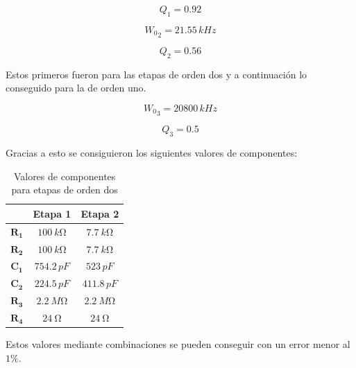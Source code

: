 \documentclass[11pt, a4paper]{article}
\begin{document}
\begin{equation}
	Q_1 = 0.92
\end{equation}

\begin{equation}
	{W_0}_2 = 21.55 \, kHz
\end{equation}

\begin{equation}
	Q_2 = 0.56
\end{equation}

	Estos primeros fueron para las etapas de orden dos y a continuación lo conseguido para la de orden uno.

\begin{equation}
	{W_0}_3 = 20800 \, kHz
\end{equation}

\begin{equation}
	Q_3 = 0.5
\end{equation}

	Gracias a esto se consiguieron los siguientes valores de componentes:
\begin{table}[H]
\centering
\begin{tabular}{|c|c|c|}
\hline
            & \textbf{Etapa 1} & \textbf{Etapa 2} \\ \hline
$\mathbf{R_1}$ & $\SI{100}{k\ohm}$               & $\SI{7.7}{k\ohm}$             \\ \hline
$\mathbf{R_2}$ & $\SI{100}{k\ohm}$               & $\SI{7.7}{k\ohm}$             \\ \hline
$\mathbf{C_1}$ & $754.2 \, pF$             & $523 \, pF$              \\ \hline
$\mathbf{C_2}$ & $224.5 \, pF$           & $411.8 \, pF$             \\ \hline
$\mathbf{R_3}$ & $\SI{2.2}{M\ohm}$             & $\SI{2.2}{M\ohm}$             \\ \hline
$\mathbf{R_4}$ & $\SI{24}{\ohm}$             & $\SI{24}{\ohm}$             \\ \hline
\end{tabular}
\caption{Valores de componentes para etapas de orden dos}
\label{tabla:legendreetapasorden2}
\end{table}

	Estos valores mediante combinaciones se pueden conseguir con un error menor al $1 \%$.
\end{document}
